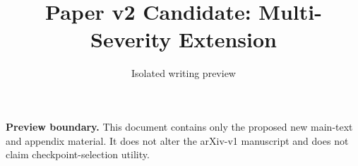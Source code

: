 \documentclass[10pt]{article}
\title{Paper v2 Candidate: Multi-Severity Extension}
\author{Isolated writing preview}
\date{}
\begin{document}
\maketitle

\noindent\textbf{Preview boundary.}
This document contains only the proposed new main-text and appendix material.
It does not alter the arXiv-v1 manuscript and does not claim checkpoint-selection
utility.

\setcounter{section}{4}


\appendix

\end{document}

